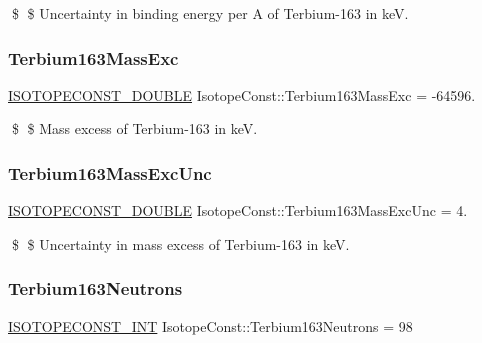 \$ \$ Uncertainty in binding energy per A of Terbium-\/163 in keV. \mbox{\label{group___isotope_const-_terbium-_tb163_ga5c2b6fe20c89794241251247e965d3cb}} 
\subsubsection{\texorpdfstring{Terbium163\+Mass\+Exc}{Terbium163MassExc}}
{\footnotesize\ttfamily \mbox{\hyperlink{group___isotope_const-_macros_ga8f45a7272ce02c0b4c65c44636ed719a}{I\+S\+O\+T\+O\+P\+E\+C\+O\+N\+S\+T\+\_\+\+D\+O\+U\+B\+LE}} Isotope\+Const\+::\+Terbium163\+Mass\+Exc = -\/64596.}

\$ \$ Mass excess of Terbium-\/163 in keV. \mbox{\label{group___isotope_const-_terbium-_tb163_ga2c8bc09eeef172e6537160c13174adf1}} 
\subsubsection{\texorpdfstring{Terbium163\+Mass\+Exc\+Unc}{Terbium163MassExcUnc}}
{\footnotesize\ttfamily \mbox{\hyperlink{group___isotope_const-_macros_ga8f45a7272ce02c0b4c65c44636ed719a}{I\+S\+O\+T\+O\+P\+E\+C\+O\+N\+S\+T\+\_\+\+D\+O\+U\+B\+LE}} Isotope\+Const\+::\+Terbium163\+Mass\+Exc\+Unc = 4.}

\$ \$ Uncertainty in mass excess of Terbium-\/163 in keV. \mbox{\label{group___isotope_const-_terbium-_tb163_gaa2e69ce6299542ccc92d228b9a7b79af}} 
\subsubsection{\texorpdfstring{Terbium163\+Neutrons}{Terbium163Neutrons}}
{\footnotesize\ttfamily \mbox{\hyperlink{group___isotope_const-_macros_ga5f18360b3e99483a35c32d789e62621c}{I\+S\+O\+T\+O\+P\+E\+C\+O\+N\+S\+T\+\_\+\+I\+NT}} Isotope\+Const\+::\+Terbium163\+Neutrons = 98}

